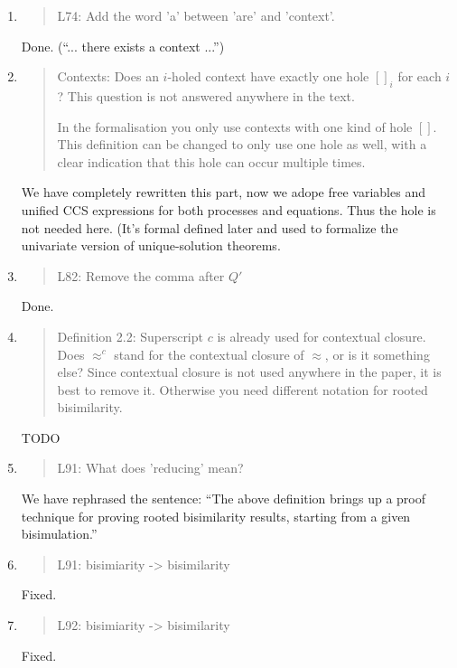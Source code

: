 \begin{enumerate}
\item \begin{quote}
    L74: Add the word 'a' between 'are' and 'context'.
  \end{quote}
  Done. (``... there exists a context ...'')
  
\item \begin{quote}
  Contexts: Does an $i$-holed context have exactly one hole $[]_i$ for
  each $i$? This question is not answered anywhere in the text.

  In the formalisation you only use contexts with one kind of hole $[]$. This definition can be changed to only
  use one hole as well, with a clear indication that this hole can occur multiple times.
\end{quote}

We have completely rewritten this part, now we adope free variables
and unified CCS expressions for both processes and equations.
 Thus the hole is not needed here. (It's formal defined later and used
 to formalize the univariate version of unique-solution theorems.

\item \begin{quote}
    L82: Remove the comma after $Q'$
  \end{quote}
  Done.
  
\item \begin{quote}
    Definition 2.2: Superscript $c$ is already used for contextual closure.
    Does $\approx^c$ stand for the contextual closure of $\approx$, or is it something else?
    Since contextual closure is not used anywhere in the paper, it is best to remove it.
    Otherwise you need different notation for rooted bisimilarity.
  \end{quote}
  TODO
  
\item \begin{quote}
    L91: What does 'reducing' mean?
  \end{quote}
We have rephrased the sentence: ``The above definition brings up a
proof technique for proving rooted bisimilarity results, starting from
a given bisimulation.''

\item \begin{quote}
    L91: bisimiarity -> bisimilarity
  \end{quote}
  Fixed.

\item \begin{quote}
    L92: bisimiarity -> bisimilarity
  \end{quote}
  Fixed.
  

\end{enumerate}
